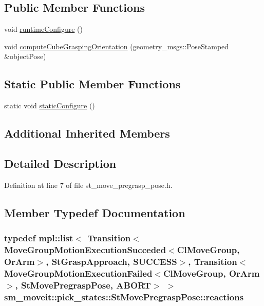 \subsection*{Public Member Functions}
\begin{DoxyCompactItemize}
\item 
void \hyperlink{structsm__moveit_1_1pick__states_1_1StMovePregraspPose_a2cb64008501b9572198a6767ec1f1fb0}{runtime\+Configure} ()
\item 
void \hyperlink{structsm__moveit_1_1pick__states_1_1StMovePregraspPose_afe2fcedf9034c3c2999e81fb289cf459}{compute\+Cube\+Grasping\+Orientation} (geometry\+\_\+msgs\+::\+Pose\+Stamped \&object\+Pose)
\end{DoxyCompactItemize}
\subsection*{Static Public Member Functions}
\begin{DoxyCompactItemize}
\item 
static void \hyperlink{structsm__moveit_1_1pick__states_1_1StMovePregraspPose_a06a3b0a3c8bd47cf6a6c77e54421d592}{static\+Configure} ()
\end{DoxyCompactItemize}
\subsection*{Additional Inherited Members}


\subsection{Detailed Description}


Definition at line 7 of file st\+\_\+move\+\_\+pregrasp\+\_\+pose.\+h.



\subsection{Member Typedef Documentation}
\subsubsection[{\texorpdfstring{reactions}{reactions}}]{\setlength{\rightskip}{0pt plus 5cm}typedef mpl\+::list$<$ Transition$<${\bf Move\+Group\+Motion\+Execution\+Succeded}$<${\bf Cl\+Move\+Group}, {\bf Or\+Arm}$>$, {\bf St\+Grasp\+Approach}, {\bf S\+U\+C\+C\+E\+SS}$>$, Transition$<${\bf Move\+Group\+Motion\+Execution\+Failed}$<${\bf Cl\+Move\+Group}, {\bf Or\+Arm}$>$, {\bf St\+Move\+Pregrasp\+Pose}, {\bf A\+B\+O\+RT}$>$ $>$ {\bf sm\+\_\+moveit\+::pick\+\_\+states\+::\+St\+Move\+Pregrasp\+Pose\+::reactions}}\hypertarget{structsm__moveit_1_1pick__states_1_1StMovePregraspPose_a24457ed9411566498ea50222265ad652}{}\label{structsm__moveit_1_1pick__states_1_1StMovePregraspPose_a24457ed9411566498ea50222265ad652}


